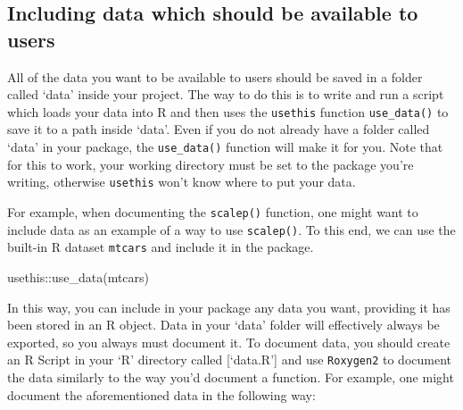 \documentclass[
]{book}
\newenvironment{Shaded}{\begin{snugshade}}{\end{snugshade}}
\newcommand{\FunctionTok}[1]{\textcolor[rgb]{0.00,0.00,0.00}{#1}}
\newcommand{\NormalTok}[1]{#1}
\newcommand{\SpecialCharTok}[1]{\textcolor[rgb]{0.00,0.00,0.00}{#1}}
\begin{document}
\hypertarget{including-data-which-should-be-available-to-users}{%
\subsection{Including data which should be available to users}\label{including-data-which-should-be-available-to-users}}

All of the data you want to be available to users should be saved in a folder called `data' inside your project. The way to do this is to write and run a script which loads your data into R and then uses the \texttt{usethis} function \texttt{use\_data()} to save it to a path inside `data'. Even if you do not already have a folder called `data' in your package, the \texttt{use\_data()} function will make it for you. Note that for this to work, your working directory must be set to the package you're writing, otherwise \texttt{usethis} won't know where to put your data.

For example, when documenting the \texttt{scalep()} function, one might want to include data as an example of a way to use \texttt{scalep()}. To this end, we can use the built-in R dataset \texttt{mtcars} and include it in the package.

\begin{Shaded}
\begin{Highlighting}[]
\NormalTok{usethis}\SpecialCharTok{::}\FunctionTok{use\_data}\NormalTok{(mtcars)}
\end{Highlighting}
\end{Shaded}

In this way, you can include in your package any data you want, providing it has been stored in an R object. Data in your `data' folder will effectively always be exported, so you always must document it. To document data, you should create an R Script in your `R' directory called {[}`data.R'{]} and use \texttt{Roxygen2} to document the data similarly to the way you'd document a function. For example, one might document the aforementioned data in the following way:
\end{document}
